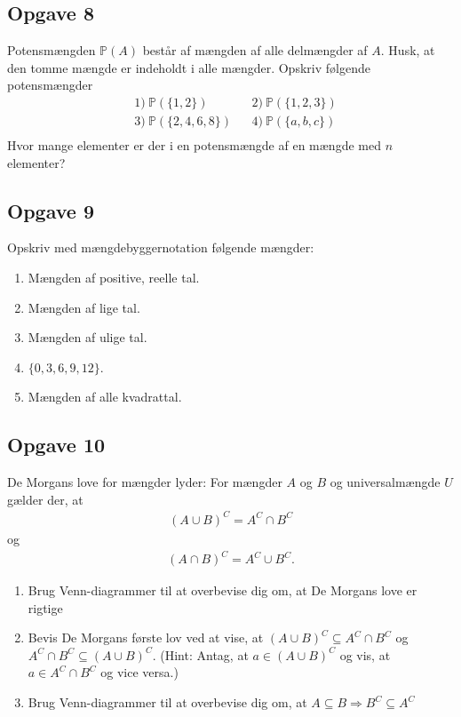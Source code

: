 \subsection*{Opgave 8}
Potensmængden $\mathbb{P}(A)$ består af mængden af alle delmængder af $A$. Husk, at den tomme mængde er indeholdt i alle mængder. Opskriv følgende potensmængder
\begin{align*}
&1) \ \mathbb{P}(\{1,2\})    &&2) \  \mathbb{P}(\{1,2,3\})  \\
&3) \ \mathbb{P}(\{2,4,6,8\})   &&4) \ \mathbb{P}(\{a,b,c\}) \\    
\end{align*}
Hvor mange elementer er der i en potensmængde af en mængde med $n$ elementer?

\subsection*{Opgave 9}
Opskriv med mængdebyggernotation følgende mængder:
\begin{enumerate}[label=\roman*)]
	\item Mængden af positive, reelle tal.
	\item Mængden af lige tal.
	\item Mængden af ulige tal.
	\item $\{0,3,6,9,12\}$.
	\item Mængden af alle kvadrattal.
\end{enumerate}
\subsection*{Opgave 10}
De Morgans love for mængder lyder: For mængder $A$ og $B$ og universalmængde $U$ gælder der, at
\begin{align*}
(A\cup B)^C = A^C \cap B^C
\end{align*} og
\begin{align*}
(A \cap B)^C = A^C \cup B^C.
\end{align*}
\begin{enumerate}[label=\roman*)]
\item Brug Venn-diagrammer til at overbevise dig om, at De Morgans love er rigtige
\item Bevis De Morgans første lov ved at vise, at $(A\cup B)^C \subseteq A^C \cap B^C$ og $ A^C \cap B^C \subseteq (A\cup B)^C$. (Hint: Antag, at $a \in (A\cup B)^C$ og vis, at $a \in A^C \cap B^C $ og vice versa.)
\item Brug Venn-diagrammer til at overbevise dig om, at $A \subseteq B \Rightarrow B^C \subseteq A^C$
\end{enumerate}

